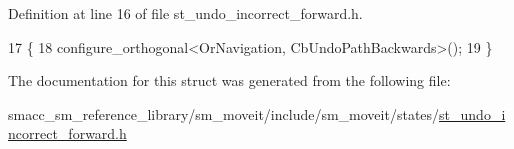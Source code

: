 Definition at line 16 of file st\+\_\+undo\+\_\+incorrect\+\_\+forward.\+h.


\begin{DoxyCode}
17     \{
18         configure\_orthogonal<OrNavigation, CbUndoPathBackwards>();
19     \}
\end{DoxyCode}


The documentation for this struct was generated from the following file\+:\begin{DoxyCompactItemize}
\item 
smacc\+\_\+sm\+\_\+reference\+\_\+library/sm\+\_\+moveit/include/sm\+\_\+moveit/states/\hyperlink{st__undo__incorrect__forward_8h}{st\+\_\+undo\+\_\+incorrect\+\_\+forward.\+h}\end{DoxyCompactItemize}
